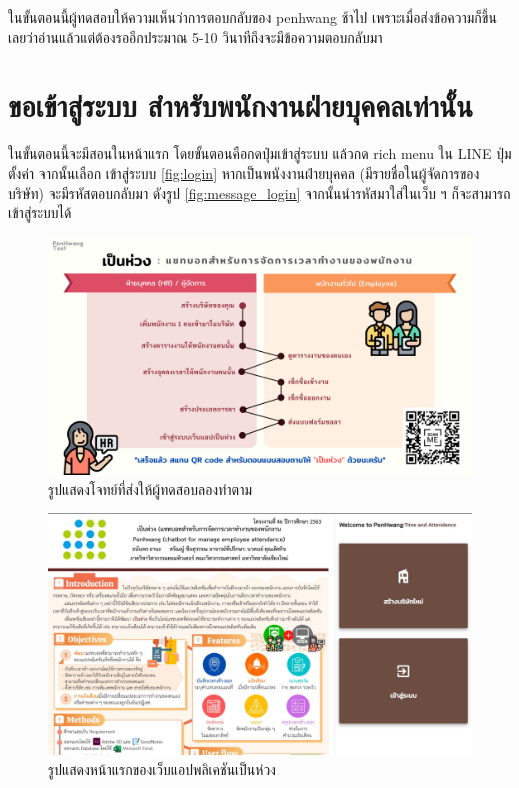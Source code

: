 ในขั้นตอนนี้ผู้ทดสอบให้ความเห็นว่าการตอบกลับของ penhwang ช้าไป เพราะเมื่อส่งข้อความก็ขึ้นเลยว่าอ่านแล้วแต่ต้องรออีกประมาณ 5-10 วินาทีถึงจะมีข้อความตอบกลับมา
\section{ขอเข้าสู่ระบบ สำหรับพนักงานฝ่ายบุคคลเท่านั้น}
ในขั้นตอนนี้จะมีสอนในหน้าแรก โดยขั้นตอนคือกดปุ่มเข้าสู่ระบบ แล้วกด rich menu ใน LINE ปุ่มตั้งค่า จากนั้นเลือก เข้าสู่ระบบ \ref{fig:login}
หากเป็นพนังงานฝ่ายบุคคล (มีรายชื่อในผู้จัดการของบริษัท) จะมีรหัสตอบกลับมา ดังรูป \ref{fig:message_login}
จากนั้นนำรหัสมาใส่ในเว็บ ฯ ก็จะสามารถเข้าสู่ระบบได้

\begin{figure}
  \begin{center}
    \includegraphics[width=14cm,keepaspectratio]{./images/test_flow.png}
  \end{center}
  \caption[รูปแสดงโจทย์ที่ส่งให้ผู้ทดสอบลองทำตาม]{รูปแสดงโจทย์ที่ส่งให้ผู้ทดสอบลองทำตาม} 
  \label{fig:eval_test}
\end{figure}

\begin{figure}
  \begin{center}
    \includegraphics[width=14cm,keepaspectratio]{./images/index.jpg}
  \end{center}
  \caption[รูปแสดงหน้าแรกของเว็บแอปพลิเคชันเป็นห่วง]{รูปแสดงหน้าแรกของเว็บแอปพลิเคชันเป็นห่วง} 
  \label{fig:index}
\end{figure}

